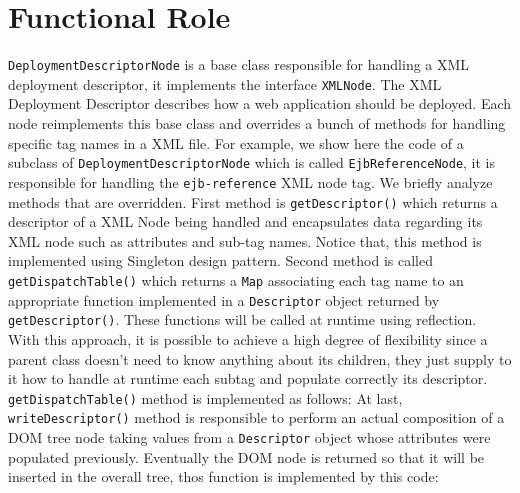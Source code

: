 \newpage
\section{Functional Role}
\texttt{DeploymentDescriptorNode} is a base class responsible for handling a XML deployment descriptor, it implements the interface \texttt{XMLNode}.\newline
The XML Deployment Descriptor describes how a web application should be deployed. Each node reimplements this base class and overrides a bunch of methods for handling specific tag names in a XML file. 
For example, we show here the code of a subclass of \texttt{DeploymentDescriptorNode} which is called \texttt{EjbReferenceNode}, it is responsible for handling the \texttt{ejb-reference} XML node tag. We briefly analyze methods that are overridden. \newline
First method is \texttt{getDescriptor()} which returns a descriptor of a XML Node being handled and encapsulates data regarding its XML node such as attributes and sub-tag names. 
Notice that, this method is implemented using Singleton design pattern.\newline
Second method is called \texttt{getDispatchTable()} which returns a \texttt{Map} associating each tag name to an appropriate function implemented in a \texttt{Descriptor} object returned by \texttt{getDescriptor()}. These functions will be called at runtime using reflection. With this approach, it is possible to achieve a high degree of flexibility since a parent class doesn't need to know anything about its children, they just supply to it how to handle at runtime each subtag and populate correctly its descriptor. \texttt{getDispatchTable()} method is implemented as follows:
At last, \texttt{writeDescriptor()} method is responsible to perform an actual composition of a DOM tree node taking values from a \texttt{Descriptor} object whose attributes were populated previously. Eventually the DOM node is returned so that it will be inserted in the overall tree, thos function is implemented by this code:
